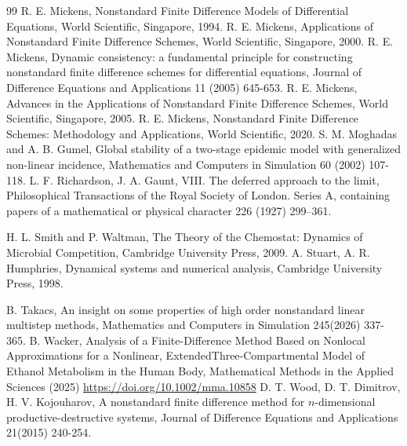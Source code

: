 \documentclass[12pt]{article}
\theoremstyle{definition}
\theoremstyle{remark}
\numberwithin{equation}{section}
\begin{document}
\begin{thebibliography}{99}
R. E. Mickens,
Nonstandard Finite Difference Models of Differential Equations, 
World Scientific, Singapore, 1994.
%
%
R. E. Mickens,
Applications of Nonstandard Finite Difference Schemes,  World Scientific, Singapore, 2000.
%
%
%
R. E. Mickens, Dynamic consistency: a fundamental principle for constructing nonstandard finite difference schemes for differential equations,  Journal of Difference Equations and Applications 11 (2005) 645-653.
%
%
R. E. Mickens,  Advances in the Applications of Nonstandard Finite Difference Schemes, World Scientific, Singapore, 2005.
%
R. E. Mickens, Nonstandard Finite Difference Schemes: Methodology and Applications, World Scientific, 2020.
%
S. M. Moghadas and A. B. Gumel,  {Global stability of a two-stage epidemic model with generalized non-linear incidence}, Mathematics and Computers in Simulation {60} (2002) 107-118.
L. F. Richardson, J. A. Gaunt, VIII. The deferred approach to the limit, Philosophical Transactions of the Royal Society of London. Series A, containing papers of a mathematical or physical character 226 (1927) 299--361.

H. L. Smith and P. Waltman,  {The Theory of the Chemostat: Dynamics of Microbial Competition}, Cambridge University Press, 2009.
A. Stuart, A. R. Humphries, Dynamical systems and numerical analysis,
Cambridge University Press, 1998.

B.  Takacs, An insight on some properties of high order nonstandard linear
multistep methods, Mathematics and Computers in Simulation
245(2026) 337-365.
B. Wacker, Analysis of a Finite-Difference Method Based on Nonlocal Approximations for a Nonlinear, ExtendedThree-Compartmental Model of Ethanol Metabolism in the Human Body, Mathematical Methods in the Applied Sciences (2025) \url{ https://doi.org/10.1002/mma.10858}
D. T. Wood, D. T. Dimitrov, H. V. Kojouharov, A nonstandard finite difference method for $n$-dimensional productive-destructive systems,   Journal of Difference Equations and Applications  21(2015)  240-254.
\end{thebibliography}
\end{document}
